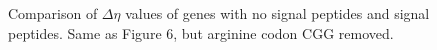 \documentclass[11pt]{labbook}
\begin{document}
\begin{figure}
\caption{Comparison of $\Delta\eta$ values of genes with no signal peptides and signal peptides. Same as Figure 6, but arginine codon CGG removed.}
\end{figure}
\end{document}
